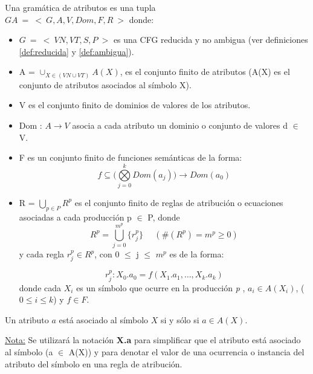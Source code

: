 \begin{definition}
\label{def:grammarattr}
Una gramática de atributos es una tupla\\
 $GA\ =\ <\ G,A,V,Dom,F,R\ >$ donde:
\begin{itemize}
\item $G\ =\ <\ VN,VT,S,P\ >$ es una CFG reducida y no ambigua (ver definiciones \ref{def:reducida} y \ref{def:ambigua}).
\item A = $\cup_{X\in(VN \cup VT)} A(X)$, es el conjunto finito de atributos (A(X) es el conjunto de atributos asociados al símbolo X).

\item V es el conjunto finito de dominios de valores de los atributos.

\item Dom : $A\rightarrow V$ asocia a cada atributo un dominio o conjunto de valores d $\in$ V.

\item F es un conjunto finito de funciones semánticas de la forma:
\begin{equation}
f \subseteq (\bigotimes\limits_{j=0}^{k}{ Dom(a_{j} ))\rightarrow Dom(a_{0})}
\end{equation}

\item R = $\bigcup _{p \in P} R^{p}$ es el conjunto finito de reglas de atribución o ecuaciones asociadas a cada producción p $\in$ P, donde
\begin{equation}
R^{p} = \bigcup\limits_{j=0}^{m^{p}}{\{r_{j}^{p}\}}\ \ \ \ \ \ (\#(R^{p} ) = m^{p} \geq 0)
\end{equation}
y cada regla $r_{j}^{p} \in R^{p}$, con 0 $\leq$ j $\leq$ $m^{p}$ es de la forma:

\begin{equation}
r_{j}^{p}: X_{0}.a_{0} = f(X_{1}.a_{1} ,\dots , X_{k}.a_{k})
\end{equation} 
donde cada $X_{i}$ es un símbolo que ocurre en la producción \textit{p} , $a_{i} \in A(X_{i})$, ($0 \leqslant i \leqslant k$) y $f \in F$.

\end{itemize}
\end{definition}

\begin{definition} Un atributo $a$ está asociado al símbolo $X$ si y sólo si $a \in A(X)$. 
\end{definition}
\underline{Nota:}
Se utilizará la notación \textbf{X.a} para simplificar que el atributo  está asociado al símbolo  (a $\in$ A(X)) y para denotar el valor de una ocurrencia o instancia del atributo  del símbolo  en una regla de atribución.

